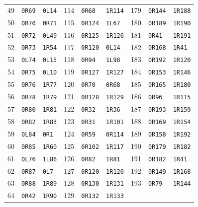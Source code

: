 \begin{longtable}{@{}rll@{\hspace{20pt}}rll@{\hspace{20pt}}rll@{}}
49 & \texttt{0R69} & \texttt{0L14} & 114 & \texttt{0R68} & \texttt{1R114} & 179 & \texttt{0R144} & \texttt{1R188}\\
50 & \texttt{0R70} & \texttt{0R71} & 115 & \texttt{0R124} & \texttt{1L67} & 180 & \texttt{0R189} & \texttt{1R190}\\
51 & \texttt{0R72} & \texttt{0L49} & 116 & \texttt{0R125} & \texttt{1R126} & 181 & \texttt{0R41} & \texttt{1R191}\\
52 & \texttt{0R73} & \texttt{1R54} & 117 & \texttt{0R120} & \texttt{0L14} & 182 & \texttt{0R168} & \texttt{1R41}\\
53 & \texttt{0L74} & \texttt{0L15} & 118 & \texttt{0R94} & \texttt{1L98} & 183 & \texttt{0R192} & \texttt{1R120}\\
54 & \texttt{0R75} & \texttt{0L10} & 119 & \texttt{0R127} & \texttt{1R127} & 184 & \texttt{0R153} & \texttt{1R146}\\
55 & \texttt{0R76} & \texttt{1R77} & 120 & \texttt{0R70} & \texttt{0R68} & 185 & \texttt{0R165} & \texttt{1R180}\\
56 & \texttt{0R78} & \texttt{1R79} & 121 & \texttt{0R128} & \texttt{1R129} & 186 & \texttt{0R96} & \texttt{1R115}\\
57 & \texttt{0R80} & \texttt{1R81} & 122 & \texttt{0R32} & \texttt{1R36} & 187 & \texttt{0R193} & \texttt{1R159}\\
58 & \texttt{0R82} & \texttt{1R83} & 123 & \texttt{0R31} & \texttt{1R101} & 188 & \texttt{0R169} & \texttt{1R154}\\
59 & \texttt{0L84} & \texttt{0R1} & 124 & \texttt{0R59} & \texttt{0R114} & 189 & \texttt{0R158} & \texttt{1R192}\\
60 & \texttt{0R85} & \texttt{1R60} & 125 & \texttt{0R102} & \texttt{1R117} & 190 & \texttt{0R179} & \texttt{1R182}\\
61 & \texttt{0L76} & \texttt{1L86} & 126 & \texttt{0R82} & \texttt{1R81} & 191 & \texttt{0R182} & \texttt{1R41}\\
62 & \texttt{0R87} & \texttt{0L7} & 127 & \texttt{0R120} & \texttt{1R120} & 192 & \texttt{0R149} & \texttt{1R168}\\
63 & \texttt{0R88} & \texttt{1R89} & 128 & \texttt{0R130} & \texttt{1R131} & 193 & \texttt{0R79} & \texttt{1R144}\\
64 & \texttt{0R42} & \texttt{1R90} & 129 & \texttt{0R132} & \texttt{1R133} &  &  & \\
\bottomrule
\end{longtable}
\endgroup
